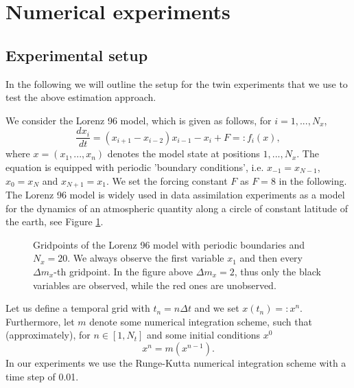 \documentclass[a4paper,10pt]{article}
\numberwithin{equation}{section}
\begin{document}
\section{Numerical experiments}
\subsection{Experimental setup}
In the following we will outline the setup for the twin experiments that we use to test the above estimation approach. 

\medskip

 We consider the Lorenz 96 model, which is given as follows, for $i=1,...,N_x$,
 \begin{equation}
 \frac{dx_i}{dt}=(x_{i+1}-x_{i-2})x_{i-1}-x_i+F=:f_i(x),
 \end{equation}
 where $x=(x_1,...,x_n)$ denotes the model state at positions $1,...,N_x$. The equation is equipped with periodic 'boundary conditions', i.e. $x_{-1}=x_{N-1}$, $x_0=x_N$ and $x_{N+1}=x_1$. We set the forcing constant $F$ as  $F=8$ in the following. The Lorenz 96 model is widely used in data assimilation experiments as a model for the dynamics of an atmospheric quantity along a circle of constant latitude of the earth, see Figure \ref{fig:circle}. 
 
 
 
\newcommand{\equic}[2][1 cm]{
\draw (0,0) circle (#1);
\pgfmathparse{#1/1 cm+0.4};
\edef\oc{\pgfmathresult cm};
  \foreach \i in {1,3,5,7,9,11,13,15,17,19} {
    \coordinate (N\i) at (-\i*360/#2:#1);
    \fill[black] (N\i) circle (0.05 cm);
    \draw (-\i*360/#2:\oc) node{$x_{\i}$};
  }
    \foreach \i in {2,4,6,8,10,12,14,16,18,20}{
    \coordinate (N\i) at (-\i*360/#2:#1);
    \fill[red] (N\i) circle (0.05 cm);
    \draw(-\i*360/#2:\oc) node[color=red]{$x_{\i}$};
  }
}

\begin{figure}[H]
\centering
{}
\caption{Gridpoints of the Lorenz 96 model with periodic boundaries and $N_x=20$. We always observe the first variable $x_1$ and then every $\Delta m_x$-th gridpoint. In the figure above $\Delta m_x=2$, thus only the black variables are observed, while the red ones are unobserved. }
\label{fig:circle}
\end{figure}
    
 
 
 
Let us define a temporal grid with $t_n=n\Delta t$ and we set $x(t_n)=:x^n$. Furthermore, let $m$ denote some numerical integration scheme, such that (approximately), for $n\in[1,N_t]$ and some initial conditions $x^0$ 
 $$x^n=m(x^{n-1}).$$ 
 In our experiments we use the Runge-Kutta numerical integration scheme with a time step of 0.01. 
 
\end{document}
